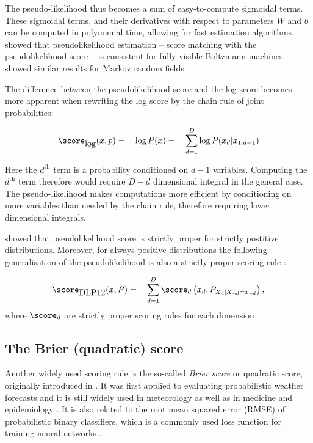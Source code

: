 The pseudo-likelihood thus becomes a sum of easy-to-compute sigmoidal terms. These sigmoidal terms, and their derivatives with respect to parameters $W$ and $b$ can be computed in polynomial time, allowing for fast estimation algorithms. \citet{Hyvarinen2006} showed that pseudolikelihood estimation -- score matching with the pseudolikelihood score -- is consistent for fully visible Boltzmann machines. \citet{Besag1977,Comets1992} showed similar results for Markov random fields.

The difference between the pseudolikelihood score and the log score becomes more apparent when rewriting the log score by the chain rule of joint probabilities:

\begin{equation}
	\score_{\mbox{log}}(x,p) = - \log P(x) =  - \sum_{d=1}^{D} \log P(x_d\vert x_{1:d-1})
\end{equation}

Here the $d^{\mbox{th}}$ term is a probability conditioned on $d-1$ variables. Computing the $d^{\mbox{th}}$ term therefore would require $D-d$ dimensional integral in the general case. The pseudo-likelihood makes computations more efficient by conditioning on more variables than needed by the chain rule, therefore requiring lower dimensional integrals.

\citet{Csiszar2004} showed that pseudolikelihood score is strictly proper for strictly postitive distributions. Moreover, for always positive distributions the following generalisation of the pseudolikelihood is also a strictly proper scoring rule \citep*{Dawid2012}:

\begin{equation}
	\score_{\mbox{DLP12}}(x,P) = - \sum_{d=1}^{D} \score_d\left(x_d, P_{X_d \vert X_{\neg d}=x_{\neg d}}\right),
\end{equation}
where $\score_d$ are strictly proper scoring rules for each dimension

\subsection{The Brier (quadratic) score}

Another widely used scoring rule is the so-called \emph{Brier score} or quadratic score, originally introduced in \citep{Brier1950}. It was first applied to evaluating probabilistic weather forecasts and it is still widely used in meteorology \citep{Ferro2007} as well as in medicine \citep{Spiegelhalter2006} and epidemiology \citep{Redelmeier1991}. It is also related to the root mean squared error (RMSE) of probabilistic binary classifiers, which is a commonly used loss function for training neural networks \citep{Rumelhart1988}.

